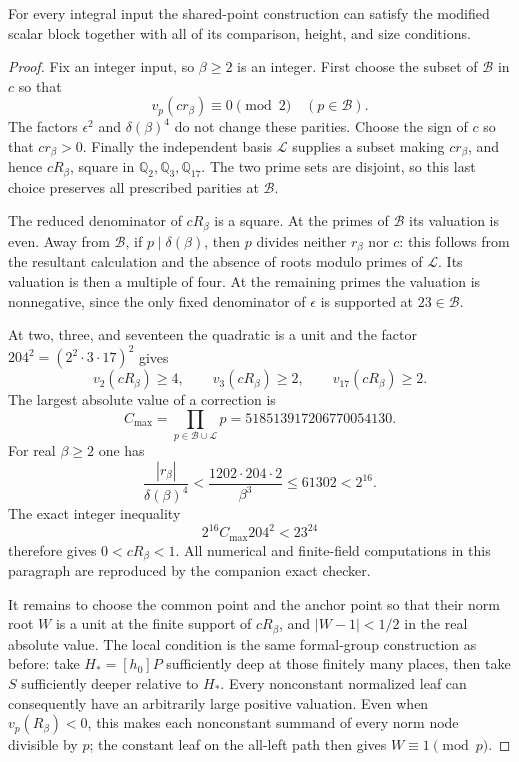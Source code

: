 \begin{lemma}
\label{lem:normalized-scalar-completeness}
For every integral input the shared-point construction can satisfy
the modified scalar block together with all of its comparison,
height, and size conditions.
\end{lemma}
\begin{proof}
Fix an integer input, so $\beta\ge2$ is an integer.  First choose
the subset of $\mathcal B$ in $c$ so that
\[
               v_p(cr_\beta)\equiv0\pmod2\quad(p\in\mathcal B).
\]
The factors $\epsilon^2$ and $\delta(\beta)^4$ do not change these
parities.  Choose the sign of $c$ so that $cr_\beta>0$.  Finally
the independent basis $\mathcal L$ supplies a subset making
$cr_\beta$, and hence $cR_\beta$, square in
$\mathbb Q_2,\mathbb Q_3,\mathbb Q_{17}$.  The two prime sets
are disjoint, so this last choice preserves all prescribed parities
at $\mathcal B$.

The reduced denominator of $cR_\beta$ is a square.  At the primes
of $\mathcal B$ its valuation is even.  Away from $\mathcal B$,
if $p\mid\delta(\beta)$, then $p$ divides neither $r_\beta$ nor
$c$: this follows from the resultant calculation and the absence
of roots modulo primes of $\mathcal L$.  Its valuation is then a
multiple of four.  At the remaining primes the valuation is
nonnegative, since the only fixed denominator of $\epsilon$ is
supported at $23\in\mathcal B$.

At two, three, and seventeen the quadratic is a unit and
the factor $204^2=(2^2\cdot3\cdot17)^2$ gives
\[
 v_2(cR_\beta)\ge4,\qquad
 v_3(cR_\beta)\ge2,\qquad
 v_{17}(cR_\beta)\ge2.
\]
The largest absolute value of a correction is
\[
 C_{\max}=\prod_{p\in\mathcal B\cup\mathcal L}p
          =518513917206770054130.
\]
For real $\beta\ge2$ one has
\[
 \frac{|r_\beta|}{\delta(\beta)^4}
 <\frac{1202\cdot204\cdot2}{\beta^3}
 \le61302<2^{16}.
\]
The exact integer inequality
\[
              2^{16}C_{\max}204^2<23^{24}
\]
therefore gives $0<cR_\beta<1$.  All numerical and finite-field
computations in this paragraph are reproduced by the companion
exact checker.

It remains to choose the common point and the anchor point so
that their norm root $W$ is a unit at the finite support of
$cR_\beta$, and $|W-1|<1/2$ in the real absolute value.  The local
condition is the same formal-group construction as before: take
$H_*=[h_0]P$ sufficiently deep at those finitely many places,
then take $S$ sufficiently deeper relative to $H_*$.  Every
nonconstant normalized leaf can consequently have an arbitrarily
large positive valuation.  Even when $v_p(R_\beta)<0$, this makes
each nonconstant summand of every norm node divisible by $p$;
the constant leaf on the all-left path then gives $W\equiv1\pmod p$.


\end{proof}
